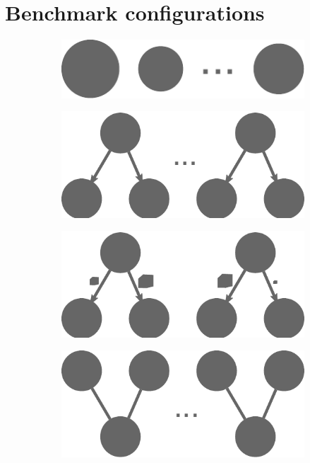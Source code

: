 \chapter{Benchmark configurations}
\label{app:benchmarks}

\begin{figure}[h]
	\centering
	\begin{subfigure}{.2\textwidth}
		\centering
		\includegraphics[width=.8\textwidth]{imgs/estee/shapes/plain}
		\caption{}
		\label{fig:tg-plain}
	\end{subfigure}%
	\begin{subfigure}{.2\textwidth}
		\centering
		\includegraphics[width=.8\linewidth]{imgs/estee/shapes/fork}
		\caption{}
		\label{fig:tg-fork}
	\end{subfigure}
	\begin{subfigure}{.2\textwidth}
		\centering
		\includegraphics[width=.8\linewidth]{imgs/estee/shapes/fork2}
		\caption{}
		\label{fig:tg-fork2}
	\end{subfigure}
	\begin{subfigure}{.2\textwidth}
		\centering
		\includegraphics[width=.8\linewidth]{imgs/estee/shapes/v}

\end{subfigure}
\end{figure}
